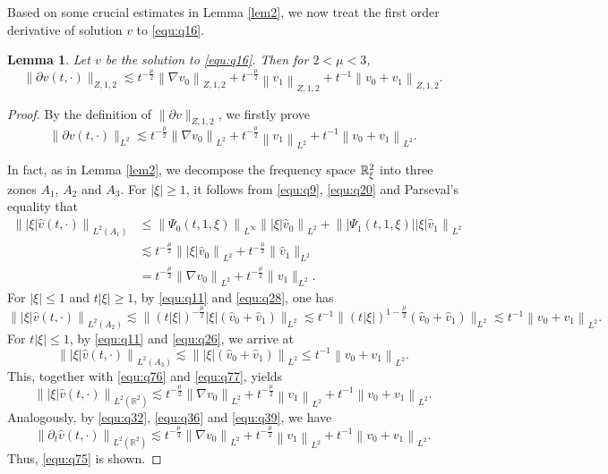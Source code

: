 \documentclass[11pt,twoside]{article}
\newcommand{\R}{\mathbb R}
\newcommand{\p}{\partial}
\newcommand{\f}{\frac}
\theoremstyle{plain}
\newtheorem{lemma}[theorem]{Lemma}
\theoremstyle{definition}
\theoremstyle{remark}
\numberwithin{equation}{section}
\begin{document}
Based on some crucial estimates in Lemma \ref{lem2},  we now treat the first order derivative of solution $v$
to \eqref{equ:q16}.
\begin{lemma}\label{lem3}
Let $v$ be the solution to \eqref{equ:q16}. Then for $2<\mu<3$,
\begin{equation}\label{equ:q74}
\|\p v(t, \cdot)\|_{Z, 1, 2} \lesssim t^{-\f{\mu}{2}}\left\|\nabla v_0\right\|_{Z, 1, 2}+t^{-\f{\mu}{2}}\left\| v_1\right\|_{Z, 1, 2}+t^{-1}\left\|v_0+v_1\right\|_{Z, 1,2}.
\end{equation}
\end{lemma}
\begin{proof}
By the definition of $\|\p v\|_{Z, 1, 2}$,  we firstly prove
\begin{equation}\label{equ:q75}
\|\p v(t, \cdot)\|_{L^2} \lesssim t^{-\f{\mu}{2}}\left\|\nabla v_0\right\|_{L^ 2}+t^{-\f{\mu}{2}}\left\| v_1\right\|_{L^ 2}+t^{-1}\left\|v_0+v_1\right\|_{L^ 2}.
\end{equation}

In fact, as in Lemma \ref{lem2}, we decompose the frequency space $\Bbb R_{\xi}^2$ into three zones
$A_1$, $A_2$ and $A_3$. For $|\xi|\geq 1$, it follows from \eqref{equ:q9}, \eqref{equ:q20} and Parseval's equality that
\begin{equation}\label{equ:q76}
\begin{aligned}
\left\||\xi|\hat{v}(t, \cdot)\right\|_{L^2(A_1)} & \leq\left\|  \Psi_{0}(t, 1, \xi)\right\|_{L^{\infty}}\left\||\xi|\hat{v}_{0}\right\|_{L^{2}}+\left\||\Psi_{1 }(t, 1, \xi)||\xi|\hat{v}_{1}\right\|_{L^{2}} \\
& \lesssim t^{-\frac{\mu}{2}}\left\||\xi| \hat{v}_{0}\right\|_{L^{2}}+t^{-\f{\mu}{2}} \|\hat{v}_{1}\|_{L^{2}}\\
& = t^{-\frac{\mu}{2}}\left\|\nabla v_{0}\right\|_{L^{2}}+t^{-\f{\mu}{2}} \|v_{1}\|_{L^{2}}.
\end{aligned}
\end{equation}
For $|\xi|\leq1$ and $t|\xi|\geq1$, by \eqref{equ:q11} and \eqref{equ:q28}, one has
\begin{equation}\label{equ:q77}
\left\||\xi|\hat{v}(t, \cdot)\right\|_{L^2(A_2)}  \lesssim \big\|(t|\xi|)^{-\f{\mu}{2}}|\xi|(\hat{v}_{0}+\hat{v}_{1})\big\|_{L^{2}}
\lesssim t^{-1} \big\|(t|\xi|)^{1-\f{\mu}{2}}(\hat{v}_{0}+\hat{v}_{1})\big\|_{L^{2}} \lesssim t^{-1}\left\|v_0+v_1\right\|_{L^ 2}.
\end{equation}
For $t|\xi|\leq1$, by \eqref{equ:q11} and \eqref{equ:q26}, we arrive at
$$
\left\||\xi|\hat{v}(t, \cdot)\right\|_{L^2(A_3)} \lesssim \left\||\xi|(\hat{v}_{0}+\hat{v}_{1})\right\|_{L^{2}}  \leq t^{-1}\left\|v_{0}+v_{1}\right\|_{L^{2}}.
$$
This, together with \eqref{equ:q76} and \eqref{equ:q77}, yields
$$
\left\||\xi|\hat{v}(t, \cdot)\right\|_{L^2(\R^2)}\lesssim t^{-\f{\mu}{2}}\left\|\nabla v_0\right\|_{L^ 2}+t^{-\f{\mu}{2}}\left\| v_1\right\|_{L^2}+t^{-1}\left\|v_0+v_1\right\|_{L^ 2}.
$$
Analogously, by \eqref{equ:q32}, \eqref{equ:q36} and \eqref{equ:q39}, we have
$$
\left\|\p_t\hat{v}(t, \cdot)\right\|_{L^2(\R^2)}\lesssim t^{-\f{\mu}{2}}\left\|\nabla v_0\right\|_{L^ 2}+t^{-\f{\mu}{2}}\left\| v_1\right\|_{L^ 2}+t^{-1}\left\|v_0+v_1\right\|_{L^ 2}.
$$
Thus, \eqref{equ:q75} is shown.


\end{proof}
\end{document}
